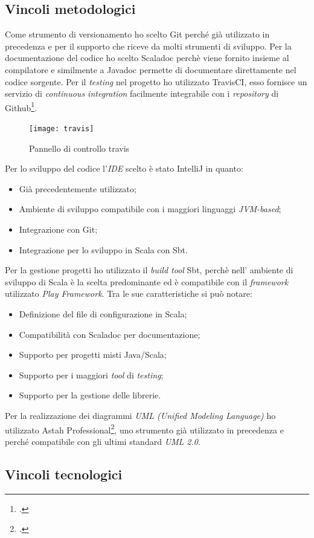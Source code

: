 \subsection{Vincoli metodologici}
Come strumento di versionamento ho scelto Git perché già utilizzato in precedenza e per il supporto che riceve da molti strumenti di sviluppo. Per la documentazione del codice ho scelto Scaladoc perchè viene fornito insieme al compilatore e similmente a Javadoc permette di documentare direttamente nel codice sorgente. Per il \emph{testing} nel progetto ho utilizzato TravisCI, esso fornisce un servizio di \emph{continuous integration} facilmente integrabile con i \emph{repository} di Github\footcite{https://github.com/}.
\begin{figure}[ht]
\centering
\texttt{[image: travis]}
\caption{Pannello di controllo travis}
\end{figure}
\newpage
Per lo sviluppo del codice l'\emph{IDE} scelto è stato IntelliJ in quanto:
\begin{itemize}
\item Già precedentemente utilizzato;
\item Ambiente di sviluppo compatibile con i maggiori linguaggi \emph{JVM-based};
\item Integrazione con Git;
\item Integrazione per lo sviluppo in Scala con Sbt.
\end{itemize}
Per la gestione progetti ho utilizzato il \emph{build tool} Sbt, perchè nell' ambiente di sviluppo di Scala è la scelta predominante ed è compatibile con il \emph{framework} utilizzato \emph{Play Framework}. Tra le sue caratteristiche si può notare:
\begin{itemize}
\item Definizione del file di configurazione in Scala;
\item Compatibilità con Scaladoc per documentazione;
\item Supporto per progetti misti Java/Scala;
\item Supporto per i maggiori \emph{tool} di \emph{testing};
\item Supporto per la gestione delle librerie.
\end{itemize}
Per la realizzazione dei diagrammi \emph{UML (Unified Modeling Language)} ho utilizzato Astah Professional\footcite{http://astah.net/}, uno strumento già utilizzato in precedenza e perché compatibile con gli ultimi standard \emph{UML 2.0}.
\subsection{Vincoli tecnologici}
